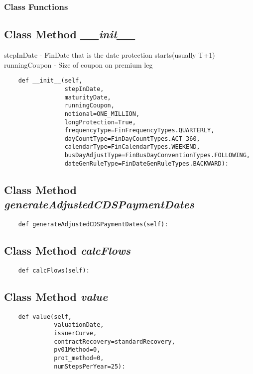 \documentclass[twoside,11pt]{book}
\begin{document}
\subsubsection{Class Functions}

\subsection{Class Method {\it \_\_init\_\_}}
stepInDate - FinDate that is the date protection starts(usually T+1) runningCoupon - Size of coupon on premium leg 

\begin{lstlisting}
    def __init__(self,
                 stepInDate,
                 maturityDate,
                 runningCoupon,
                 notional=ONE_MILLION,
                 longProtection=True,
                 frequencyType=FinFrequencyTypes.QUARTERLY,
                 dayCountType=FinDayCountTypes.ACT_360,
                 calendarType=FinCalendarTypes.WEEKEND,
                 busDayAdjustType=FinBusDayConventionTypes.FOLLOWING,
                 dateGenRuleType=FinDateGenRuleTypes.BACKWARD):
\end{lstlisting}

\subsection{Class Method {\it generateAdjustedCDSPaymentDates}}


\begin{lstlisting}
    def generateAdjustedCDSPaymentDates(self):
\end{lstlisting}

\subsection{Class Method {\it calcFlows}}


\begin{lstlisting}
    def calcFlows(self):
\end{lstlisting}

\subsection{Class Method {\it value}}


\begin{lstlisting}
    def value(self,
              valuationDate,
              issuerCurve,
              contractRecovery=standardRecovery,
              pv01Method=0,
              prot_method=0,
              numStepsPerYear=25):
\end{lstlisting}
\end{document}
